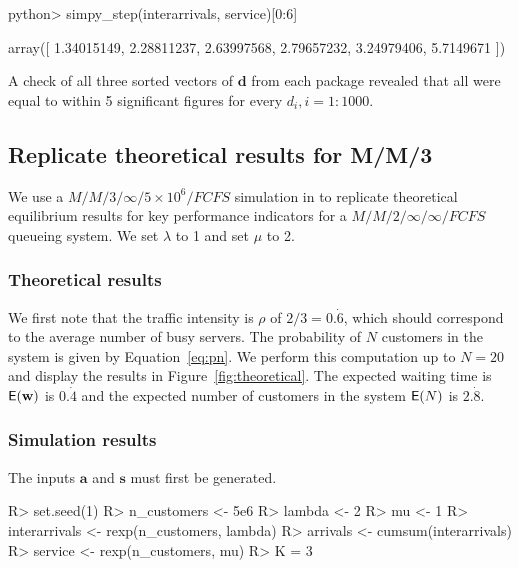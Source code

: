 \documentclass[article]{jss}
\begin{document}
\begin{CodeChunk}
\begin{Sinput}
python> simpy_step(interarrivals, service)[0:6]
\end{Sinput}
\begin{Soutput}
array([ 1.34015149,  2.28811237,  2.63997568,  2.79657232,  3.24979406, 
	5.7149671 ])
\end{Soutput}
\end{CodeChunk}

A check of all three sorted vectors of $\mathbf{d}$ from each package revealed that all were equal to within 5 significant figures for every $d_i, i = 1:1000$.  

\subsection{Replicate theoretical results for M/M/3}

We use a $M/M/3/\infty/5 \times 10^6/FCFS$ simulation in  to replicate theoretical equilibrium results for key performance indicators for a $M/M/2/\infty/\infty/FCFS$ queueing system. We set $\lambda$ to 1 and set $\mu$ to 2.

\subsubsection{Theoretical results}

We first note that the traffic intensity is $\rho$ of $2/3 = 0.\dot{6}$, which should correspond to the average number of busy servers. The probability of $N$ customers in the system is given by Equation~\ref{eq:pn}. We perform this computation up to $N = 20$ and display the results in Figure~\ref{fig:theoretical}. The expected waiting time is $\mathsf{E}(\mathbf{w})$ is $0.\dot{4}$ and the expected number of customers in the system $\mathsf{E}(N)$ is $2.\dot{8}$.

\subsubsection{Simulation results}

The inputs $\mathbf{a}$ and $\mathbf{s}$ must first be generated. 

\begin{CodeChunk}
\begin{Sinput}
R> set.seed(1) 
R> n_customers <- 5e6
R> lambda <- 2
R> mu <- 1
R> interarrivals <- rexp(n_customers, lambda)
R> arrivals <- cumsum(interarrivals)
R> service <- rexp(n_customers, mu)
R> K = 3
\end{Sinput}
\end{CodeChunk}
\end{document}
